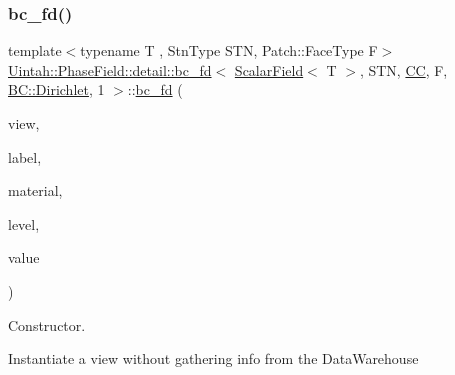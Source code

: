 \subsubsection{\texorpdfstring{bc\+\_\+fd()}{bc\_fd()}\hspace{0.1cm}{\footnotesize\ttfamily [2/3]}}
{\footnotesize\ttfamily template$<$typename T , Stn\+Type S\+TN, Patch\+::\+Face\+Type F$>$ \\
\hyperlink{classUintah_1_1PhaseField_1_1detail_1_1bc__fd}{Uintah\+::\+Phase\+Field\+::detail\+::bc\+\_\+fd}$<$ \hyperlink{structUintah_1_1PhaseField_1_1ScalarField}{Scalar\+Field}$<$ T $>$, S\+TN, \hyperlink{namespaceUintah_1_1PhaseField_a33d355affda78a83f45755ba8388cedda22303704507d024d1d6508ed9859a85a}{CC}, F, \hyperlink{namespaceUintah_1_1PhaseField_a148fba372aa3be96fd6eede7a2fa10b5abac152b762896edff34ed668ae1a546f}{B\+C\+::\+Dirichlet}, 1 $>$\+::\hyperlink{classUintah_1_1PhaseField_1_1detail_1_1bc__fd}{bc\+\_\+fd} (\begin{DoxyParamCaption}\item[{const \hyperlink{classUintah_1_1PhaseField_1_1detail_1_1view}{view}$<$ \hyperlink{structUintah_1_1PhaseField_1_1ScalarField}{Field} $>$ $\ast$}]{view,  }\item[{const Var\+Label $\ast$}]{label,  }\item[{int}]{material,  }\item[{const Level $\ast$}]{level,  }\item[{const V \&}]{value }\end{DoxyParamCaption})\hspace{0.3cm}{\ttfamily [inline]}}



Constructor. 

Instantiate a view without gathering info from the Data\+Warehouse


